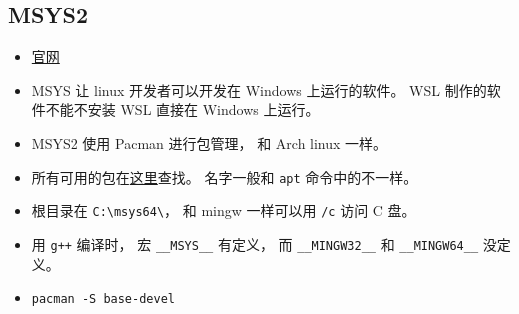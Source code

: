 \subsection{MSYS2}
\begin{itemize}
\item \href{https://www.msys2.org/}{官网}
\item MSYS 让 linux 开发者可以开发在 Windows 上运行的软件。 WSL 制作的软件不能不安装 WSL 直接在 Windows 上运行。
\item MSYS2 使用 Pacman 进行包管理， 和 Arch linux 一样。
\item 所有可用的包在\href{https://packages.msys2.org/queue}{这里}查找。 名字一般和 \verb|apt| 命令中的不一样。
\item 根目录在 \verb|C:\msys64\|， 和 mingw 一样可以用 \verb|/c| 访问 C 盘。
\item 用 \verb|g++| 编译时， 宏 \verb|__MSYS__| 有定义， 而 \verb|__MINGW32__| 和 \verb|__MINGW64__| 没定义。
\item \verb|pacman -S base-devel|
\end{itemize}
